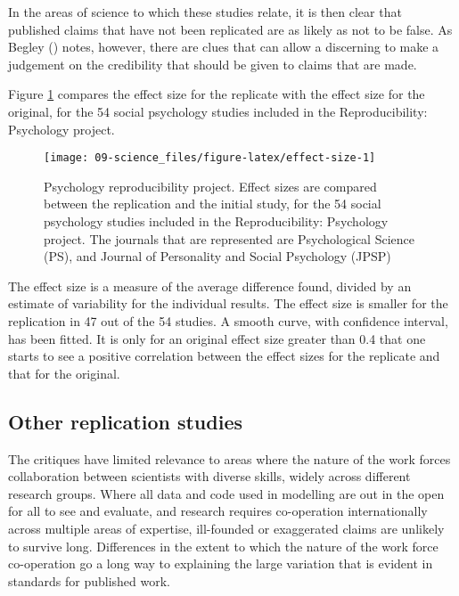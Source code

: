 \documentclass[
  10ptls,
  b5paper]{book}
\begin{document}
In the areas of science to which these studies relate,
it is then clear that published claims that have not
been replicated are as likely as not to be false. As
Begley () notes, however, there are clues that
can allow a discerning to make a judgement on the
credibility that should be given to claims that are
made.

Figure \ref{fig:effect-size} compares the effect size
for the replicate with the effect size for the original,
for the 54 social psychology studies included in the
Reproducibility: Psychology project.

\begin{figure}[H]

{\centering \texttt{[image: 09-science\_files/figure-latex/effect-size-1]} 

}

\caption{Psychology reproducibility project. Effect sizes are
compared between the replication and the initial study, for the 
54 social psychology studies included in the Reproducibility:
Psychology project. The journals that are represented are 
Psychological Science (PS), and Journal of Personality and 
Social Psychology (JPSP)}\label{fig:effect-size}
\end{figure}

The effect size is a measure of the average difference found,
divided by an estimate of variability for the individual
results. The effect size is smaller for the replication in 47
out of the 54 studies. A smooth curve, with confidence interval,
has been fitted. It is only for an original effect size
greater than 0.4 that one starts to see a positive correlation
between the effect sizes for the replicate and that for the
original.

\subsection*{Other replication studies}\label{other-replication-studies}

The critiques have limited relevance to areas where the nature
of the work forces collaboration between scientists with
diverse skills, widely across different research groups.
Where all data and code used in modelling are out in the open
for all to see and evaluate, and research requires co-operation
internationally across multiple areas of expertise, ill-founded
or exaggerated claims are unlikely to survive long. Differences
in the extent to which the nature of the work force co-operation
go a long way to explaining the large variation that is evident
in standards for published work.
\end{document}
